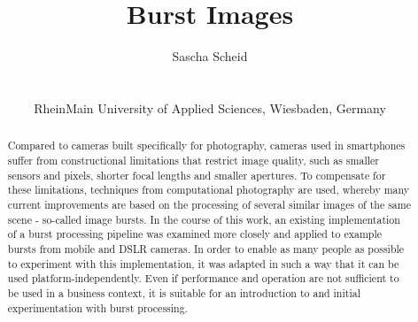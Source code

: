 \documentclass{egpubl}
\title[Burst Images]%
      {Burst Images}
\author[Sascha Scheid]
    {\parbox{\textwidth}
        {\centering 
			Sascha Scheid
        }
        \\
    {\parbox{\textwidth}
        {\centering RheinMain University of Applied Sciences, Wiesbaden, Germany\\
       }
    }
}
\begin{document}


\maketitle


\begin{abstract}
Compared to cameras built specifically for photography, cameras used in smartphones 
suffer from constructional limitations that restrict image quality, such as smaller 
sensors and pixels, shorter focal lengths and smaller apertures. To compensate for 
these limitations, techniques from computational photography are used, whereby many 
current improvements are based on the processing of several similar images of the same 
scene - so-called image bursts. In the course of this work, an existing implementation 
of a burst processing pipeline was examined more closely and applied to example bursts 
from mobile and DSLR cameras. In order to enable as many people as possible to 
experiment with this implementation, it was adapted in such a way that it can be 
used platform-independently. Even if performance and operation are not sufficient 
to be used in a business context, it is suitable for an introduction to and initial 
experimentation with burst processing.
\end{abstract}  
\end{document}
